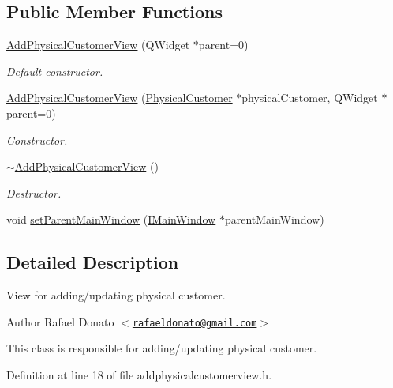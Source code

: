\subsection*{\-Public \-Member \-Functions}
\begin{DoxyCompactItemize}
\item 
\hyperlink{class_add_physical_customer_view_a77e095ce09b8d470da848f69e0d60723}{\-Add\-Physical\-Customer\-View} (\-Q\-Widget $\ast$parent=0)
\begin{DoxyCompactList}\small\item\em \-Default constructor. \end{DoxyCompactList}\item 
\hyperlink{class_add_physical_customer_view_a8d5ff1517e961420247a64cb1638ead6}{\-Add\-Physical\-Customer\-View} (\hyperlink{class_physical_customer}{\-Physical\-Customer} $\ast$physical\-Customer, \-Q\-Widget $\ast$parent=0)
\begin{DoxyCompactList}\small\item\em \-Constructor. \end{DoxyCompactList}\item 
\hyperlink{class_add_physical_customer_view_a36e1058f618fd30c5dbc511b328e35a1}{$\sim$\-Add\-Physical\-Customer\-View} ()
\begin{DoxyCompactList}\small\item\em \-Destructor. \end{DoxyCompactList}\item 
void \hyperlink{class_add_physical_customer_view_a7189aa197c9899ceff069cbead353c2b}{set\-Parent\-Main\-Window} (\hyperlink{class_i_main_window}{\-I\-Main\-Window} $\ast$parent\-Main\-Window)
\end{DoxyCompactItemize}


\subsection{\-Detailed \-Description}
\-View for adding/updating physical customer. 

\begin{DoxyAuthor}{\-Author}
\-Rafael \-Donato $<$\href{mailto:rafaeldonato@gmail.com}{\tt rafaeldonato@gmail.\-com}$>$
\end{DoxyAuthor}
\-This class is responsible for adding/updating physical customer. 

\-Definition at line 18 of file addphysicalcustomerview.\-h.




